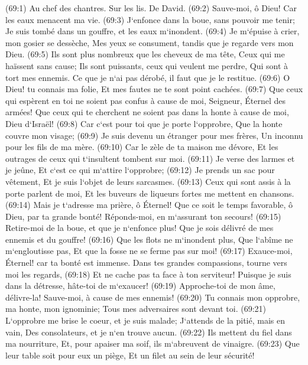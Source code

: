 \verse (69:1) Au chef des chantres. Sur les lis. De David. (69:2) Sauve-moi, ô Dieu! Car les eaux menacent ma vie. 
\verse (69:3) J`enfonce dans la boue, sans pouvoir me tenir; Je suis tombé dans un gouffre, et les eaux m`inondent. 
\verse (69:4) Je m`épuise à crier, mon gosier se dessèche, Mes yeux se consument, tandis que je regarde vers mon Dieu. 
\verse (69:5) Ils sont plus nombreux que les cheveux de ma tête, Ceux qui me haïssent sans cause; Ils sont puissants, ceux qui veulent me perdre, Qui sont à tort mes ennemis. Ce que je n`ai pas dérobé, il faut que je le restitue. 
\verse (69:6) O Dieu! tu connais ma folie, Et mes fautes ne te sont point cachées. 
\verse (69:7) Que ceux qui espèrent en toi ne soient pas confus à cause de moi, Seigneur, Éternel des armées! Que ceux qui te cherchent ne soient pas dans la honte à cause de moi, Dieu d`Israël! 
\verse (69:8) Car c`est pour toi que je porte l`opprobre, Que la honte couvre mon visage; 
\verse (69:9) Je suis devenu un étranger pour mes frères, Un inconnu pour les fils de ma mère. 
\verse (69:10) Car le zèle de ta maison me dévore, Et les outrages de ceux qui t`insultent tombent sur moi. 
\verse (69:11) Je verse des larmes et je jeûne, Et c`est ce qui m`attire l`opprobre; 
\verse (69:12) Je prends un sac pour vêtement, Et je suis l`objet de leurs sarcasmes. 
\verse (69:13) Ceux qui sont assis à la porte parlent de moi, Et les buveurs de liqueurs fortes me mettent en chansons. 
\verse (69:14) Mais je t`adresse ma prière, ô Éternel! Que ce soit le temps favorable, ô Dieu, par ta grande bonté! Réponds-moi, en m`assurant ton secours! 
\verse (69:15) Retire-moi de la boue, et que je n`enfonce plus! Que je sois délivré de mes ennemis et du gouffre! 
\verse (69:16) Que les flots ne m`inondent plus, Que l`abîme ne m`engloutisse pas, Et que la fosse ne se ferme pas sur moi! 
\verse (69:17) Exauce-moi, Éternel! car ta bonté est immense. Dans tes grandes compassions, tourne vers moi les regards, 
\verse (69:18) Et ne cache pas ta face à ton serviteur! Puisque je suis dans la détresse, hâte-toi de m`exaucer! 
\verse (69:19) Approche-toi de mon âme, délivre-la! Sauve-moi, à cause de mes ennemis! 
\verse (69:20) Tu connais mon opprobre, ma honte, mon ignominie; Tous mes adversaires sont devant toi. 
\verse (69:21) L`opprobre me brise le coeur, et je suis malade; J`attends de la pitié, mais en vain, Des consolateurs, et je n`en trouve aucun. 
\verse (69:22) Ils mettent du fiel dans ma nourriture, Et, pour apaiser ma soif, ils m`abreuvent de vinaigre. 
\verse (69:23) Que leur table soit pour eux un piège, Et un filet au sein de leur sécurité! 

